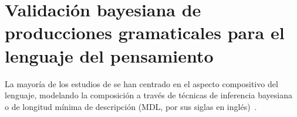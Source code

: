 

\chapter{Validación bayesiana de producciones gramaticales para el lenguaje del pensamiento}\label{chapter:PO}



La mayoría de los estudios de \lot se han centrado en el aspecto compositivo del lenguaje, modelando la composición a través de técnicas de inferencia bayesiana~\cite{tenenbaum2011grow} o de longitud mínima de descripción (MDL, por sus siglas en inglés)~\cite{amalric2017language,goldsmith2002probabilistic,romano2013language,goldsmith2001unsupervised}.


